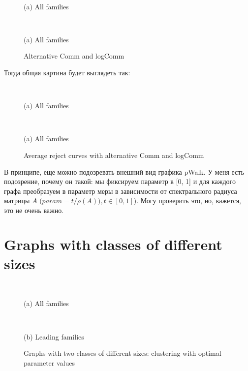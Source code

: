 \documentclass{article}
\begin{document}
\begin{figure}[H] %
	\begin{minipage}{.33\textwidth}
		\\\centerline{(a) All families}
	\end{minipage}%
	\begin{minipage}{.33\textwidth}
		\\\centerline{(a) All families}
	\end{minipage}%
\caption{\label{f_Rcur}Alternative Comm and logComm}
\end{figure}

Тогда общая картина будет выглядеть так:

\begin{figure}[H] %
	\begin{minipage}{.56\textwidth}
		\\\centerline{(a) All families}
	\end{minipage}%
	\begin{minipage}{.56\textwidth}
		\\\centerline{(a) All families}
	\end{minipage}%
\caption{\label{f_Rcur}Average reject curves with alternative Comm and logComm}
\end{figure}

В принципе, еще можно подозревать внешний вид графика pWalk. У меня есть подозрение, почему он такой: мы фиксируем параметр в [0, 1] и для каждого графа преобразуем в параметр меры в зависимости от спектрального радиуса матрицы $A$ ($ param = t / \rho(A)), t \in [0, 1]$). Могу проверить это, но, кажется, это не очень важно.


\newpage
\section{Graphs with classes of different sizes}
\begin{figure}[H]
	\begin{minipage}{.5\textwidth}
		\\\centerline{(a) All families}
	\end{minipage}%
	\begin{minipage}{.5\textwidth}
		\\\centerline{(b) Leading families}
	\end{minipage}
\caption{\label{f_difClas}Graphs with two classes of different sizes: clustering with optimal parameter values}
\end{figure}
\end{document}
